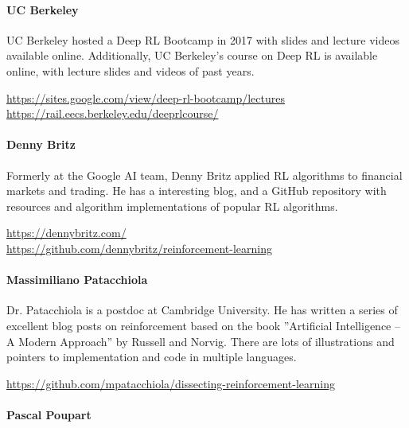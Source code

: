 \paragraph*{UC Berkeley}

UC Berkeley hosted a Deep RL Bootcamp in 2017 with slides and lecture videos available online. Additionally, UC Berkeley's course on Deep RL is available online, with lecture slides and videos of past years.

\begin{resourcebox}
\footnotesize
\url{https://sites.google.com/view/deep-rl-bootcamp/lectures} \\

\url{https://rail.eecs.berkeley.edu/deeprlcourse/}
\end{resourcebox}


\paragraph*{Denny Britz}

Formerly at the Google AI team, Denny Britz applied RL algorithms to financial markets and trading. He has a interesting blog, and a GitHub repository with resources and algorithm implementations of popular RL algorithms. \\

\begin{resourcebox}
\footnotesize
\url{https://dennybritz.com/} \\

\url{https://github.com/dennybritz/reinforcement-learning}
\end{resourcebox}


\paragraph*{Massimiliano Patacchiola} 

Dr. Patacchiola is a postdoc at Cambridge University. He has written a series of excellent blog posts on reinforcement based on the book ''Artificial Intelligence -- A Modern Approach'' by Russell and Norvig. There are lots of illustrations and pointers to implementation and code in multiple languages. \\

\begin{resourcebox}
\footnotesize
\url{https://github.com/mpatacchiola/dissecting-reinforcement-learning}
\end{resourcebox}

\paragraph*{Pascal Poupart}

